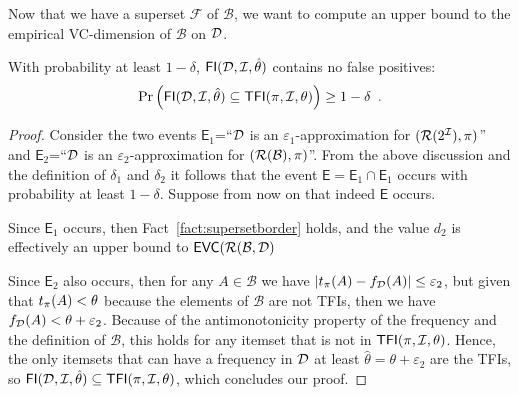 Now that we
have a superset $\mathcal{F}$ of $\mathcal{B}$, we want to compute an upper
bound to the empirical VC-dimension of $\mathcal{B}$ on ${\cal D}$. 

\begin{theorem}\label{lem:vcfull}
With probability at least $1-\delta$, $\mathsf{FI}({\cal D},{\cal I},\hat\theta)$ contains no
false positives:
\[
\Pr\left(\mathsf{FI}({\cal D},{\cal I},\hat\theta)\subseteq\mathsf{TFI}(\pi,{\cal I},\theta)\right)\ge 1-\delta\enspace.\]
\end{theorem}
\begin{proof}
  Consider the two events $\mathsf{E}_1$=``${\cal D}$ is an
  $\varepsilon_1$-approximation for $(\mathcal{R}(2^{\cal I}),\pi)$'' and
  $\mathsf{E}_2$=``${\cal D}$ is an $\varepsilon_2$-approximation for
  $(\mathcal{R}(\mathcal{B}),\pi)$''. From the above discussion and the definition
  of $\delta_1$ and $\delta_2$ it follows that the event
  $\mathsf{E}=\mathsf{E}_1\cap\mathsf{E}_1$ occurs with probability at least
  $1-\delta$. Suppose from now on that indeed $\mathsf{E}$ occurs.

  Since $\mathsf{E}_1$ occurs, then Fact~\ref{fact:supersetborder} holds, and
  the value $d_2$ is effectively an upper bound to $\mathsf{EVC}(\mathcal{R}(\mathcal{B},{\cal D})$

  Since $\mathsf{E}_2$ also occurs, then for any $A\in\mathcal{B}$ we have
  $|t_\pi(A)-f_{\cal D}(A)|\le\varepsilon_2$, but given that $t_\pi(A)<\theta$
  because the elements of $\mathcal{B}$ are not TFIs, then we have
  $f_{\cal D}(A)<\theta+\varepsilon_2$. Because of the antimonotonicity property of
  the frequency and the definition of $\mathcal{B}$, this holds for any itemset
  that is not in $\mathsf{TFI}(\pi,{\cal I},\theta)$. Hence, the only itemsets that can
  have a frequency in ${\cal D}$ at least $\hat{\theta}=\theta+\varepsilon_2$ are the
  TFIs, so $\mathsf{FI}({\cal D},{\cal I},\hat{\theta})\subseteq\mathsf{TFI}(\pi,{\cal I},\theta)$, which
  concludes our proof.
\end{proof}

